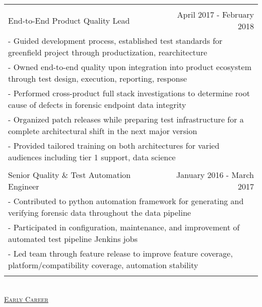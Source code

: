 \documentclass[letterpaper]{article}
\begin{document}
\begin{center}
\begin{tabular}{p{}p{}r}
			\\
			\\		%
				\multicolumn{2}{p{0.5\textwidth}}{\quad End-to-End Product Quality Lead}
				&
				{April 2017 - February 2018 \quad\quad\quad\quad}
			\\
				\multicolumn{3}{p{\textwidth}}{\quad\quad - Guided development process, established test standards for greenfield project through productization, rearchitecture} 
			\\
				\multicolumn{3}{p{\textwidth}}{\quad\quad - Owned end-to-end quality upon integration into product ecosystem through test design, execution, reporting, response} 
			\\
				\multicolumn{3}{p{\textwidth}}{\quad\quad - Performed cross-product full stack investigations to determine root cause of defects in forensic endpoint data integrity} 
			\\
				\multicolumn{3}{p{\textwidth}}{\quad\quad - Organized patch releases while preparing test infrastructure for a complete architectural shift in the next major version} 
			\\
				\multicolumn{3}{p{\textwidth}}{\quad\quad - Provided tailored training on both architectures for varied audiences including tier 1 support, data science}
			\\
			\\
				\multicolumn{2}{p{0.5\textwidth}}{\quad Senior Quality \& Test Automation Engineer}
				&
				{January 2016 - March 2017 \quad\quad\quad\quad}
			\\
				\multicolumn{3}{p{\textwidth}}{\quad\quad - Contributed to python automation framework for generating and verifying forensic data throughout the data pipeline} 
			\\
				\multicolumn{3}{p{\textwidth}}{\quad\quad - Participated in configuration, maintenance, and improvement of automated test pipeline Jenkins jobs}
			\\
				\multicolumn{3}{p{\textwidth}}{\quad\quad - Led team through feature release to improve feature coverage, platform/compatibility coverage, automation stability}  
			\\
			\\
		\end{tabular} \\
		\vspace{2.25in}
		\underline{\large \scshape Early Career}
		\begin{tabular}{p{}p{}r}
		\\
			

\end{tabular}
\end{center}
\end{document}
